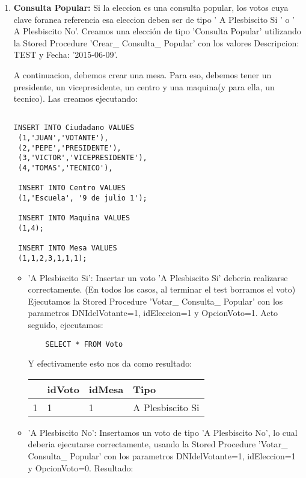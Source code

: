 \begin{enumerate}

\item \textbf{Consulta Popular:} Si la eleccion es una consulta popular, los votos cuya clave foranea
referencia esa eleccion deben ser de tipo ' A Plesbiscito Si ' o ' A Plesbiscito No'. Creamos una elección de tipo 'Consulta Popular' utilizando la Stored Procedure 'Crear\_ Consulta\_ Popular' con los valores Descripcion: TEST y Fecha: '2015-06-09'. 

A continuacion, debemos crear una mesa. Para eso, debemos tener un presidente, un vicepresidente,
un centro y una maquina(y para ella, un tecnico). Las creamos ejecutando:

\begin{lstlisting}

INSERT INTO Ciudadano VALUES
 (1,'JUAN','VOTANTE'),
 (2,'PEPE','PRESIDENTE'),
 (3,'VICTOR','VICEPRESIDENTE'),
 (4,'TOMAS','TECNICO'),
 
 INSERT INTO Centro VALUES
 (1,'Escuela', '9 de julio 1');

 INSERT INTO Maquina VALUES
 (1,4);

 INSERT INTO Mesa VALUES
 (1,1,2,3,1,1,1);
\end{lstlisting}

	\begin{itemize}
	\item 'A Plesbiscito Si': Insertar un voto 'A Plesbiscito Si' deberia realizarse correctamente. (En todos los casos, al terminar el test borramos el voto)
	Ejecutamos la Stored Procedure 'Votar\_ Consulta\_ Popular' con los parametros DNIdelVotante=1, idEleccion=1 y OpcionVoto=1. Acto seguido, ejecutamos:
	\begin{lstlisting}
	SELECT * FROM Voto
	\end{lstlisting}
	Y efectivamente esto nos da como resultado:	
	\vspace{2mm}
	
	\begin{tabular}{| l| l| l| l| }
	\hline 
	   & idVoto & idMesa & Tipo \\
	   \hline
	 1 & 1 & 1 & A Plesbiscito Si \\
 	 \hline 
	\end{tabular}
	
	\vspace{2mm}
	\item 'A Plesbiscito No': Insertamos un voto de tipo 'A Plesbiscito No', lo cual deberia ejecutarse correctamente, usando la Stored Procedure 'Votar\_ Consulta\_ Popular' con los parametros DNIdelVotante=1, idEleccion=1 y OpcionVoto=0. Resultado:
	

\end{itemize}
\end{enumerate}
